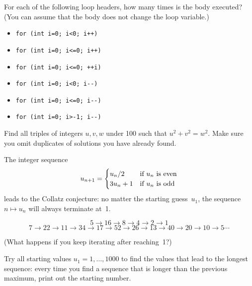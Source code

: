 \begin{exercise}
  For each of the following loop headers, how many times is the body
  executed? (You can assume that the body does not change the loop variable.)
  \begin{itemize}
  \item 
\begin{verbatim}
for (int i=0; i<0; i++)
\end{verbatim}
  \item 
\begin{verbatim}
for (int i=0; i<=0; i++)
\end{verbatim}
  \item 
\begin{verbatim}
for (int i=0; i<=0; ++i)
\end{verbatim}
  \item 
\begin{verbatim}
for (int i=0; i<0; i--)
\end{verbatim}
  \item 
\begin{verbatim}
for (int i=0; i<=0; i--)
\end{verbatim}
  \item 
\begin{verbatim}
for (int i=0; i>-1; i--)
\end{verbatim}
  \end{itemize}
\end{exercise}

\begin{exercise}
  \label{ex:pythagoras}
  Find all triples of integers $u,v,w$ under 100 such that
  $u^2+v^2=w^2$. Make sure you omit duplicates of solutions you have
  already found.
\end{exercise}

\begin{exercise}
  \label{ex:collatz}
  The integer sequence
  \[ u_{n+1} = 
  \begin{cases}
    u_n/2&\hbox{if $u_n$ is even}\\
    3u_n+1&\hbox{if $u_n$ is odd}\\
  \end{cases}
  \]
  leads to the Collatz conjecture: no matter the starting guess~$u_1$,
  the sequence $n\mapsto u_n$ will always terminate at~1.

  { \small
  \[ 5\rightarrow 16\rightarrow 8\rightarrow 4\rightarrow 2\rightarrow 1\]
  \[ 7\rightarrow 22\rightarrow 11\rightarrow 34\rightarrow
  17\rightarrow 52\rightarrow 26\rightarrow 13\rightarrow
  40\rightarrow 20\rightarrow 10\rightarrow 5\cdots \]
  }

  (What happens if you keep iterating after reaching~1?)
  
  Try all starting values $u_1=1,\ldots,1000$ to find the values that
  lead to the longest sequence: every time you find a sequence that is
  longer than the previous maximum, print out the starting number.
\end{exercise}

